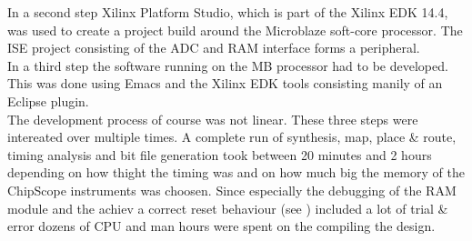 In a second step Xilinx Platform Studio, which is part of the Xilinx
\gls{EDK} 14.4, was used to create a project build around the Microblaze
soft-core processor. The ISE project consisting of the \gls{ADC} and \gls{RAM}
interface forms a peripheral. \\

In a third step the software running on the \gls{MB} processor had to be
developed. This was done using Emacs and the Xilinx \gls{EDK} tools
consisting manily of an Eclipse plugin. \\

The development process of course was not linear. These three steps were
intereated over multiple times. A complete run of synthesis, map, 
place \& route, timing analysis and bit file generation
took between 20 minutes and 2 hours depending on how thight the timing was
and on how much big the memory of the ChipScope instruments was choosen.
Since especially the debugging of the \gls{RAM} module and the achiev a correct
reset behaviour (see ) included a lot of trial \& error 
dozens of \acrshort{CPU} and man hours were spent on the compiling the design.
